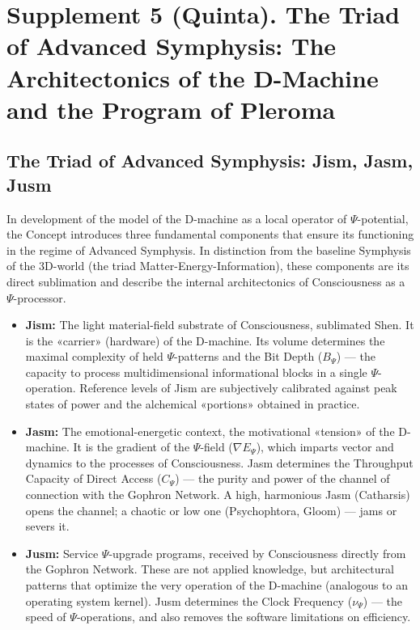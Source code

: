\documentclass[a4paper,12pt]{article}
\begin{document}
	\newpage
	\section{Supplement 5 (Quinta). The Triad of Advanced Symphysis: The Architectonics of the D-Machine and the Program of Pleroma}
	
	\subsection{The Triad of Advanced Symphysis: Jism, Jasm, Jusm}
	
	In development of the model of the D-machine as a local operator of $\Psi$-potential, the Concept introduces three fundamental components that ensure its functioning in the regime of Advanced Symphysis. In distinction from the baseline Symphysis of the 3D-world (the triad Matter-Energy-Information), these components are its direct sublimation and describe the internal architectonics of Consciousness as a $\Psi$-processor.
	
	\begin{itemize}
		\item \textbf{Jism:} The light material-field substrate of Consciousness, sublimated Shen. It is the «carrier» (hardware) of the D-machine. Its volume determines the maximal complexity of held $\Psi$-patterns and the Bit Depth ($B_{\Psi}$) — the capacity to process multidimensional informational blocks in a single $\Psi$-operation. Reference levels of Jism are subjectively calibrated against peak states of power and the alchemical «portions» obtained in practice.
		
		\item \textbf{Jasm:} The emotional-energetic context, the motivational «tension» of the D-machine. It is the gradient of the $\Psi$-field ($\nabla E_{\Psi}$), which imparts vector and dynamics to the processes of Consciousness. Jasm determines the Throughput Capacity of Direct Access ($C_{\Psi}$) — the purity and power of the channel of connection with the Gophron Network. A high, harmonious Jasm (Catharsis) opens the channel; a chaotic or low one (Psychophtora, Gloom) — jams or severs it.
		
		\item \textbf{Jusm:} Service $\Psi$-upgrade programs, received by Consciousness directly from the Gophron Network. These are not applied knowledge, but architectural patterns that optimize the very operation of the D-machine (analogous to an operating system kernel). Jusm determines the Clock Frequency ($\nu_{\Psi}$) — the speed of $\Psi$-operations, and also removes the software limitations on efficiency.
	\end{itemize}
	
\end{document}
